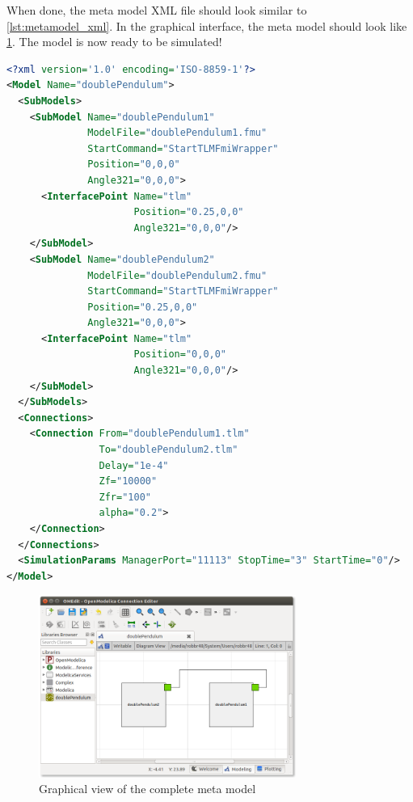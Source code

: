 \documentclass[11pt,a4paper,english]{report}
\begin{document}
When done, the meta model XML file should look similar to \cref{lst:metamodel_xml}.
In the graphical interface, the meta model should look like \cref{fig:metamodel_omedit}.
The model is now ready to be simulated!

\begin{lstlisting}[language=xml,float,floatplacement=ht,label={lst:metamodel_xml},caption=XML description of the complete meta model]
<?xml version='1.0' encoding='ISO-8859-1'?>
<Model Name="doublePendulum">
  <SubModels>
    <SubModel Name="doublePendulum1" 
              ModelFile="doublePendulum1.fmu"
              StartCommand="StartTLMFmiWrapper" 
              Position="0,0,0" 
              Angle321="0,0,0">
      <InterfacePoint Name="tlm" 
                      Position="0.25,0,0" 
                      Angle321="0,0,0"/>
    </SubModel>
    <SubModel Name="doublePendulum2" 
              ModelFile="doublePendulum2.fmu" 
              StartCommand="StartTLMFmiWrapper" 
              Position="0.25,0,0"  
              Angle321="0,0,0">
      <InterfacePoint Name="tlm" 
                      Position="0,0,0" 
                      Angle321="0,0,0"/>
    </SubModel>
  </SubModels>
  <Connections>
    <Connection From="doublePendulum1.tlm" 
                To="doublePendulum2.tlm" 
                Delay="1e-4" 
                Zf="10000"   
                Zfr="100"
                alpha="0.2">
    </Connection>
  </Connections>
  <SimulationParams ManagerPort="11113" StopTime="3" StartTime="0"/>
</Model>
\end{lstlisting}

\begin{figure}[ht]
\centering
\includegraphics[width=0.75\textwidth]{gfx/metamodel.png}
\caption{Graphical view of the complete meta model}
\label{fig:metamodel_omedit}
\end{figure}





\end{document}
